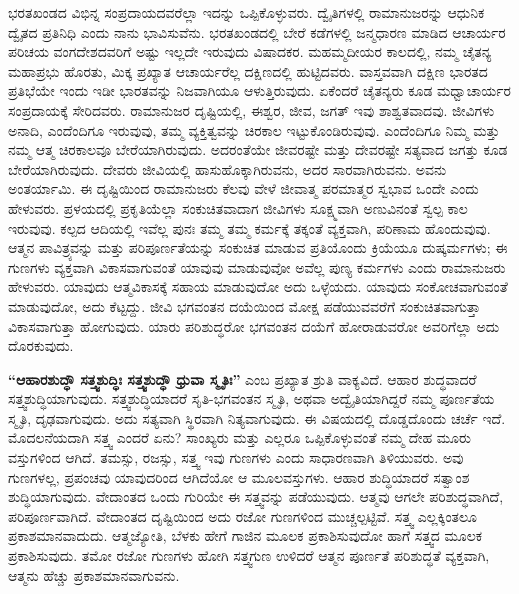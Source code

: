 ಭರತಖಂಡದ ವಿಭಿನ್ನ ಸಂಪ್ರದಾಯದವರೆಲ್ಲಾ ಇದನ್ನು ಒಪ್ಪಿಕೊಳ್ಳುವರು. ದ್ವೈತಿಗಳಲ್ಲಿ ರಾಮಾನುಜರನ್ನು ಆಧುನಿಕ ದ್ವೈತದ ಪ್ರತಿನಿಧಿ ಎಂದು ನಾನು ಭಾವಿಸುವೆನು. ಭರತಖಂಡದಲ್ಲಿ ಬೇರೆ ಕಡೆಗಳಲ್ಲಿ ಜನ್ಮಧಾರಣ ಮಾಡಿದ ಆಚಾರ್ಯರ ಪರಿಚಯ ವಂಗದೇಶದವರಿಗೆ ಅಷ್ಟು ಇಲ್ಲದೇ ಇರುವುದು ವಿಷಾದಕರ. ಮಹಮ್ಮದೀಯರ ಕಾಲದಲ್ಲಿ, ನಮ್ಮ ಚೈತನ್ಯ ಮಹಾಪ್ರಭು ಹೊರತು, ಮಿಕ್ಕ ಪ್ರಖ್ಯಾತ ಆಚಾರ್ಯರೆಲ್ಲ ದಕ್ಷಿಣದಲ್ಲಿ ಹುಟ್ಟಿದವರು. ವಾಸ್ತವವಾಗಿ ದಕ್ಷಿಣ ಭಾರತದ ಪ್ರತಿಭೆಯೇ ಇಂದು ಇಡೀ ಭಾರತವನ್ನು ನಿಜವಾಗಿಯೂ ಆಳುತ್ತಿರುವುದು. ಏಕೆಂದರೆ ಚೈತನ್ಯರು ಕೂಡ ಮಧ್ವಾಚಾರ್ಯರ ಸಂಪ್ರದಾಯಕ್ಕೆ ಸೇರಿದವರು. ರಾಮಾನುಜರ ದೃಷ್ಟಿಯಲ್ಲಿ, ಈಶ್ವರ, ಜೀವ, ಜಗತ್​ ಇವು ಶಾಶ್ವತವಾದವು. ಜೀವಿಗಳು ಅನಾದಿ, ಎಂದೆಂದಿಗೂ ಇರುವುವು, ತಮ್ಮ ವ್ಯಕ್ತಿತ್ವವನ್ನು ಚಿರಕಾಲ ಇಟ್ಟುಕೊಂಡಿರುವುವು. ಎಂದೆಂದಿಗೂ ನಿಮ್ಮ ಮತ್ತು ನಮ್ಮ ಆತ್ಮ ಚಿರಕಾಲವೂ ಬೇರೆಯಾಗಿರುವುದು. ಅದರಂತೆಯೇ ಜೀವರಷ್ಟೇ ಮತ್ತು ದೇವರಷ್ಟೇ ಸತ್ಯವಾದ ಜಗತ್ತು ಕೂಡ ಬೇರೆಯಾಗಿರುವುದು. ದೇವರು ಜೀವಿಯಲ್ಲಿ ಹಾಸುಹೊಕ್ಕಾಗಿರುವನು, ಅದರ ಸಾರವಾಗಿರುವನು. ಅವನು ಅಂತರ್ಯಾಮಿ. ಈ ದೃಷ್ಟಿಯಿಂದ ರಾಮಾನುಜರು ಕೆಲವು ವೇಳೆ ಜೀವಾತ್ಮ ಪರಮಾತ್ಮರ ಸ್ವಭಾವ ಒಂದೇ ಎಂದು ಹೇಳುವರು. ಪ್ರಳಯದಲ್ಲಿ ಪ್ರಕೃತಿಯೆಲ್ಲಾ ಸಂಕುಚಿತವಾದಾಗ ಜೀವಿಗಳು ಸೂಕ್ಷ್ಮವಾಗಿ ಅಣುವಿನಂತೆ ಸ್ವಲ್ಪ ಕಾಲ ಇರುವುವು. ಕಲ್ಪದ ಆದಿಯಲ್ಲಿ ಇವೆಲ್ಲ ಪುನಃ ತಮ್ಮ ತಮ್ಮ ಕರ್ಮಕ್ಕೆ ತಕ್ಕಂತೆ ವ್ಯಕ್ತವಾಗಿ, ಪರಿಣಾಮ ಹೊಂದುವುವು. ಆತ್ಮನ ಪಾವಿತ್ರ್ಯವನ್ನು ಮತ್ತು ಪರಿಪೂರ್ಣತೆಯನ್ನು ಸಂಕುಚಿತ ಮಾಡುವ ಪ್ರತಿಯೊಂದು ಕ್ರಿಯೆಯೂ ದುಷ್ಕರ್ಮಗಳು; ಈ ಗುಣಗಳು ವ್ಯಕ್ತವಾಗಿ ವಿಕಾಸವಾಗುವಂತೆ ಯಾವುವು ಮಾಡುವುವೋ ಅವೆಲ್ಲ ಪುಣ್ಯ ಕರ್ಮಗಳು ಎಂದು ರಾಮಾನುಜರು ಹೇಳುವರು. ಯಾವುದು ಆತ್ಮವಿಕಾಸಕ್ಕೆ ಸಹಾಯ ಮಾಡುವುದೋ ಅದು ಒಳ್ಳೆಯದು. ಯಾವುದು ಸಂಕೋಚವಾಗುವಂತೆ ಮಾಡುವುದೋ, ಅದು ಕೆಟ್ಟದ್ದು. ಜೀವಿ ಭಗವಂತನ ದಯೆಯಿಂದ ಮೋಕ್ಷ ಪಡೆಯುವವರೆಗೆ ಸಂಕುಚಿತವಾಗುತ್ತಾ ವಿಕಾಸವಾಗುತ್ತಾ ಹೋಗುವುದು. ಯಾರು ಪರಿಶುದ್ಧರೋ ಭಗವಂತನ ದಯೆಗೆ ಹೋರಾಡುವರೋ ಅವರಿಗೆಲ್ಲಾ ಅದು ದೊರಕುವುದು.

\textbf{“ಆಹಾರಶುದ್ಧೌ ಸತ್ತ್ವಶುದ್ಧಿಃ ಸತ್ತ್ವಶುದ್ಧೌ ಧ್ರುವಾ ಸ್ಮೃತಿಃ”} ಎಂಬ ಪ್ರಖ್ಯಾತ ಶ್ರುತಿ ವಾಕ್ಯವಿದೆ. ಆಹಾರ ಶುದ್ಧವಾದರೆ ಸತ್ತ್ವಶುದ್ಧಿಯಾಗುವುದು. ಸತ್ತ್ವಶುದ್ಧಿಯಾದರೆ ಸೃತಿ-ಭಗವಂತನ ಸ್ಮೃತಿ, ಅಥವಾ ಅದ್ವೈತಿಯಾಗಿದ್ದರೆ ನಮ್ಮ ಪೂರ್ಣತೆಯ ಸ್ಮೃತಿ, ದೃಢವಾಗುವುದು. ಅದು ಸತ್ಯವಾಗಿ ಸ್ಥಿರವಾಗಿ ನಿತ್ಯವಾಗುವುದು. ಈ ವಿಷಯದಲ್ಲಿ ದೊಡ್ಡದೊಂದು ಚರ್ಚೆ ಇದೆ. ಮೊದಲನೆಯದಾಗಿ ಸತ್ತ್ವ ಎಂದರೆ ಏನು? ಸಾಂಖ್ಯರು ಮತ್ತು ಎಲ್ಲರೂ ಒಪ್ಪಿಕೊಳ್ಳುವಂತೆ ನಮ್ಮ ದೇಹ ಮೂರು ವಸ್ತುಗಳಿಂದ ಆಗಿದೆ. ತಮಸ್ಸು, ರಜಸ್ಸು, ಸತ್ತ್ವ ಇವು ಗುಣಗಳು ಎಂದು ಸಾಧಾರಣವಾಗಿ ತಿಳಿಯುವರು. ಅವು ಗುಣಗಳಲ್ಲ, ಪ್ರಪಂಚವು ಯಾವುದರಿಂದ ಆಗಿದೆಯೋ ಆ ಮೂಲವಸ್ತುಗಳು. ಆಹಾರ ಶುದ್ಧಿಯಾದರೆ ಸತ್ವಾಂಶ ಶುದ್ಧಿಯಾಗುವುದು. ವೇದಾಂತದ ಒಂದು ಗುರಿಯೇ ಈ ಸತ್ತ್ವವನ್ನು ಪಡೆಯುವುದು. ಆತ್ಮವು ಆಗಲೇ ಪರಿಶುದ್ಧವಾಗಿದೆ, ಪರಿಪೂರ್ಣವಾಗಿದೆ. ವೇದಾಂತದ ದೃಷ್ಟಿಯಿಂದ ಅದು ರಜೋ ಗುಣಗಳಿಂದ ಮುಚ್ಚಲ್ಪಟ್ಟಿವೆ. ಸತ್ತ್ವ ಎಲ್ಲಕ್ಕಿಂತಲೂ ಪ್ರಕಾಶಮಾನವಾದುದು. ಆತ್ಮಜ್ಯೋತಿ, ಬೆಳಕು ಹೇಗೆ ಗಾಜಿನ ಮೂಲಕ ಪ್ರಕಾಶಿಸುವುದೋ ಹಾಗೆ ಸತ್ತ್ವದ ಮೂಲಕ ಪ್ರಕಾಶಿಸುವುದು. ತಮೋ ರಜೋ ಗುಣಗಳು ಹೋಗಿ ಸತ್ತ್ವಗುಣ ಉಳಿದರೆ ಆತ್ಮನ ಪೂರ್ಣತೆ ಪರಿಶುದ್ಧತೆ ವ್ಯಕ್ತವಾಗಿ, ಆತ್ಮನು ಹೆಚ್ಚು ಪ್ರಕಾಶಮಾನವಾಗುವನು.

